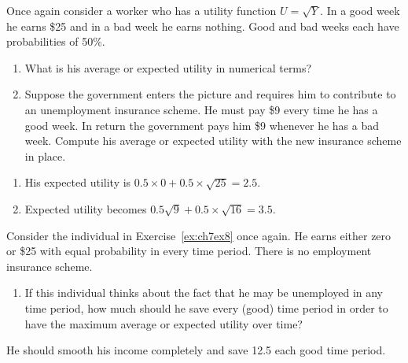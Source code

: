 \begin{enumialphparenastyle}
\begin{ex}\label{ex:ch7ex8}
Once again consider a worker who has a utility function $U=\sqrt{Y}$. In a good week he earns \$25 and in a bad week he earns nothing. Good and bad weeks each have probabilities of 50\%.
\begin{enumerate}
	\item	What is his average or expected utility in numerical terms?
	\item	Suppose the government enters the picture and requires him to contribute to an unemployment insurance scheme. He must pay \$9 every time he has a good week. In return the government pays him \$9 whenever he has a bad week. Compute his average or expected utility with the new insurance scheme in place.
\end{enumerate}
\begin{sol}
\begin{enumerate}
	\item	His expected utility is $0.5\times 0+0.5\times\sqrt{25}=2.5$.
	\item	Expected utility becomes $0.5\sqrt{9}+0.5\times\sqrt{16}=3.5$.
\end{enumerate}
\end{sol}
\end{ex}

\begin{ex}\label{ex:ch7ex9}
Consider the individual in Exercise~\ref{ex:ch7ex8} once again. He earns either zero or \$25 with equal probability in every time period. There is no employment insurance scheme.
\begin{enumerate}
	\item	If this individual thinks about the fact that he may be unemployed in any time period, how much should he save every (good) time period in order to have the maximum average or expected utility over time?
\end{enumerate}
\begin{sol}
	He should smooth his income completely and save 12.5 each good time period.
\end{sol}
\end{ex}


\end{enumialphparenastyle}
